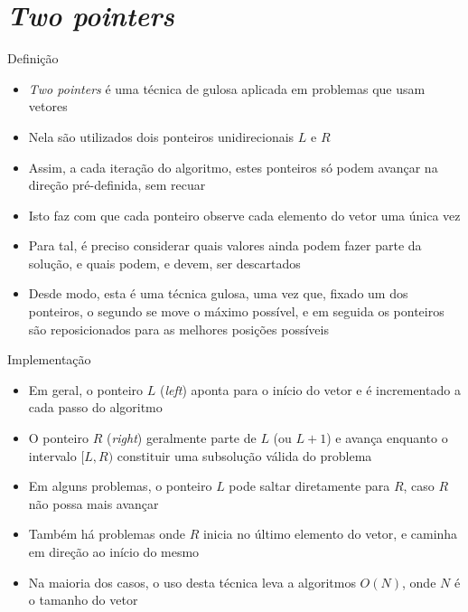 \section{\it Two pointers}

\begin{frame}[fragile]{Definição}

    \begin{itemize}
        \item \textit{Two pointers} é uma técnica de gulosa aplicada em problemas que usam
            vetores

        \item Nela são utilizados dois ponteiros unidirecionais $L$ e $R$

        \item Assim, a cada iteração do algoritmo, estes ponteiros só podem avançar na direção
            pré-definida, sem recuar

        \item Isto faz com que cada ponteiro observe cada elemento do vetor uma única vez

        \item Para tal, é preciso considerar quais valores ainda podem fazer parte da solução,
            e quais podem, e devem, ser descartados

        \item Desde modo, esta é uma técnica gulosa, uma vez que, fixado um dos ponteiros, o
            segundo se move o máximo possível, e em seguida os ponteiros são reposicionados para
            as melhores posições possíveis

    \end{itemize}

\end{frame}

\begin{frame}[fragile]{Implementação}

    \begin{itemize}
        \item Em geral, o ponteiro $L$ (\textit{left}) aponta para o início do vetor e é
            incrementado a cada passo do algoritmo

        \item O ponteiro $R$ (\textit{right}) geralmente parte de $L$ (ou $L + 1$) e avança
            enquanto o intervalo $[L, R)$ constituir uma subsolução válida do problema

        \item Em alguns problemas, o ponteiro $L$ pode saltar diretamente para $R$, caso $R$ não
            possa mais avançar

        \item Também há problemas onde $R$ inicia no último elemento do vetor, e caminha em direção
            ao início do mesmo

        \item Na maioria dos casos, o uso desta técnica leva a algoritmos $O(N)$, onde $N$ é o tamanho
            do vetor
    \end{itemize}

\end{frame}

